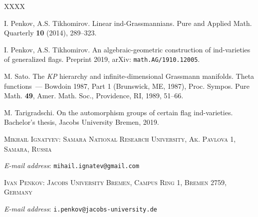 \documentclass[11pt, a4paper]{article}
\begin{document}
\begin{thebibliography}{XXXX}

 I. Penkov, A.S. Tikhomirov. Linear ind-Grassmannians. Pure and Applied Math. Quarterly \textbf{10} (2014), 289--323.

 I. Penkov, A.S. Tikhomirov. An algebraic-geometric construction of ind-varieties of generalized flags. Preprint 2019, arXiv: \texttt{math.AG/1910.12005}.



  M. Sato. The \emph{KP} hierarchy and infinite-dimensional Grassmann manifolds. Theta functions~---
Bowdoin 1987, Part 1 (Brunswick, ME, 1987), Proc. Sympos. Pure Math. \textbf{49}, Amer.
Math. Soc., Providence, RI, 1989, 51--66.



 M. Tarigradschi. On the automorphism groups of certain flag ind-varieties. Bachelor's thesis, Jacobs University Bremen, 2019. 



\end{thebibliography}

\medskip\textsc{Mikhail Ignatyev: Samara National Research University, Ak. Pavlova 1, Samara\break{}, Russia}

\emph{E-mail address}: \texttt{mihail.ignatev@gmail.com}

\medskip\textsc{Ivan Penkov: Jacobs University Bremen, Campus Ring 1, Bremen 2759, Germany}

\emph{E-mail address}: \texttt{i.penkov@jacobs-university.de}

\newpage
\end{document}
